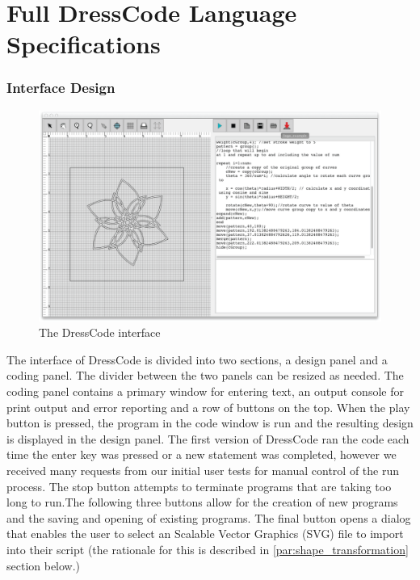 \chapter{Full DressCode Language Specifications}

\subsection{Interface Design}
 \begin{center}
\begin{figure}[h!]
\includegraphics[width=6.5in]{images/dress_code_interface.png}
\caption{The DressCode interface}
\label{fig:dress_code_interface}
\end{figure}
\end{center}

The interface of DressCode is divided into two sections, a design panel and a coding panel. The divider between the two panels can be resized as needed. The coding panel contains a primary window for entering text, an output console for print output and error reporting and a row of buttons on the top. When the play button is pressed, the program in the code window is run and the resulting design is displayed in the design panel. The first version of DressCode ran the code each time the enter key was pressed or a new statement was completed, however we received many requests from our initial user tests for manual control of the run process. The stop button attempts to terminate programs that are taking too long to run.The following three buttons allow for the creation of new programs and the saving and opening of existing programs. The final button opens a dialog that enables the user to select an Scalable Vector Graphics (SVG) file to import into their script (the rationale for this is described in \ref{par:shape_transformation} section below.)

